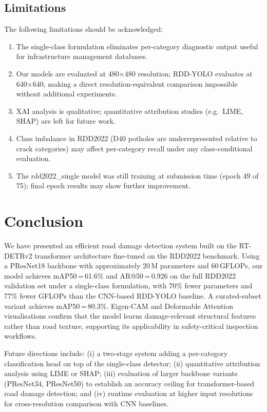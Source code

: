 \documentclass[conference]{IEEEtran}
\begin{document}
\subsection{Limitations}

The following limitations should be acknowledged:
\begin{enumerate}
  \item The single-class formulation eliminates per-category diagnostic output useful
        for infrastructure management databases.
  \item Our models are evaluated at 480$\times$480 resolution; RDD-YOLO evaluates at
        640$\times$640, making a direct resolution-equivalent comparison impossible
        without additional experiments.
  \item XAI analysis is qualitative; quantitative attribution studies (e.g.\ LIME,
        SHAP) are left for future work.
  \item Class imbalance in RDD2022 (D40 potholes are underrepresented relative to
        crack categories) may affect per-category recall under any class-conditional
        evaluation.
  \item The rdd2022\_single model was still training at submission time (epoch 49 of
        75); final epoch results may show further improvement.
\end{enumerate}

\section{Conclusion}
\label{sec:conclusion}

We have presented an efficient road damage detection system built on the RT-DETRv2
transformer architecture fine-tuned on the RDD2022 benchmark.
Using a PResNet18 backbone with approximately 20\,M parameters and 60\,GFLOPs, our
model achieves mAP50\,=\,61.6\% and AR@50\,=\,0.926 on the full RDD2022 validation
set under a single-class formulation, with 70\% fewer parameters and 77\% fewer
GFLOPs than the CNN-based RDD-YOLO baseline.
A curated-subset variant achieves mAP50\,=\,80.3\%.
Eigen-CAM and Deformable Attention visualisations confirm that the model learns
damage-relevant structural features rather than road texture, supporting its
applicability in safety-critical inspection workflows.

Future directions include:
(i) a two-stage system adding a per-category classification head on top of the
single-class detector;
(ii) quantitative attribution analysis using LIME or SHAP;
(iii) evaluation of larger backbone variants (PResNet34, PResNet50) to establish an
accuracy ceiling for transformer-based road damage detection;
and (iv) runtime evaluation at higher input resolutions for cross-resolution
comparison with CNN baselines.



\end{document}
